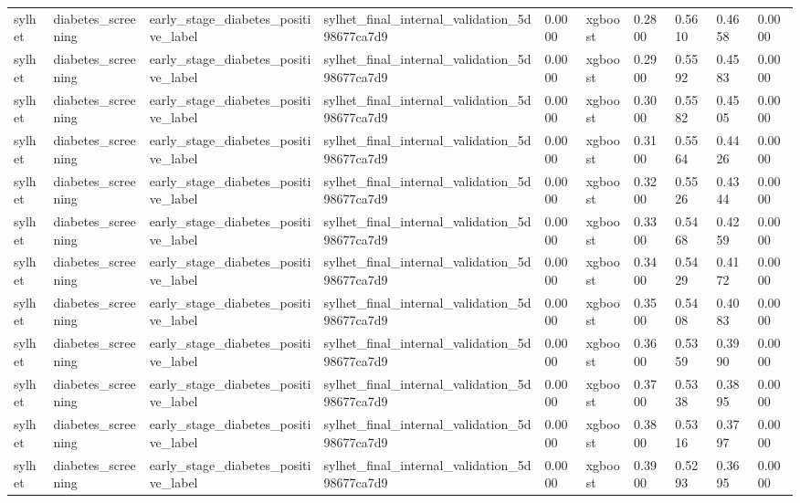 \begin{tabular}{llllllllll}
sylhet & diabetes\_screening & early\_stage\_diabetes\_positive\_label & sylhet\_final\_internal\_validation\_5d98677ca7d9 & 0.0000 & xgboost & 0.2800 & 0.5610 & 0.4658 & 0.0000 \\
sylhet & diabetes\_screening & early\_stage\_diabetes\_positive\_label & sylhet\_final\_internal\_validation\_5d98677ca7d9 & 0.0000 & xgboost & 0.2900 & 0.5592 & 0.4583 & 0.0000 \\
sylhet & diabetes\_screening & early\_stage\_diabetes\_positive\_label & sylhet\_final\_internal\_validation\_5d98677ca7d9 & 0.0000 & xgboost & 0.3000 & 0.5582 & 0.4505 & 0.0000 \\
sylhet & diabetes\_screening & early\_stage\_diabetes\_positive\_label & sylhet\_final\_internal\_validation\_5d98677ca7d9 & 0.0000 & xgboost & 0.3100 & 0.5564 & 0.4426 & 0.0000 \\
sylhet & diabetes\_screening & early\_stage\_diabetes\_positive\_label & sylhet\_final\_internal\_validation\_5d98677ca7d9 & 0.0000 & xgboost & 0.3200 & 0.5526 & 0.4344 & 0.0000 \\
sylhet & diabetes\_screening & early\_stage\_diabetes\_positive\_label & sylhet\_final\_internal\_validation\_5d98677ca7d9 & 0.0000 & xgboost & 0.3300 & 0.5468 & 0.4259 & 0.0000 \\
sylhet & diabetes\_screening & early\_stage\_diabetes\_positive\_label & sylhet\_final\_internal\_validation\_5d98677ca7d9 & 0.0000 & xgboost & 0.3400 & 0.5429 & 0.4172 & 0.0000 \\
sylhet & diabetes\_screening & early\_stage\_diabetes\_positive\_label & sylhet\_final\_internal\_validation\_5d98677ca7d9 & 0.0000 & xgboost & 0.3500 & 0.5408 & 0.4083 & 0.0000 \\
sylhet & diabetes\_screening & early\_stage\_diabetes\_positive\_label & sylhet\_final\_internal\_validation\_5d98677ca7d9 & 0.0000 & xgboost & 0.3600 & 0.5359 & 0.3990 & 0.0000 \\
sylhet & diabetes\_screening & early\_stage\_diabetes\_positive\_label & sylhet\_final\_internal\_validation\_5d98677ca7d9 & 0.0000 & xgboost & 0.3700 & 0.5338 & 0.3895 & 0.0000 \\
sylhet & diabetes\_screening & early\_stage\_diabetes\_positive\_label & sylhet\_final\_internal\_validation\_5d98677ca7d9 & 0.0000 & xgboost & 0.3800 & 0.5316 & 0.3797 & 0.0000 \\
sylhet & diabetes\_screening & early\_stage\_diabetes\_positive\_label & sylhet\_final\_internal\_validation\_5d98677ca7d9 & 0.0000 & xgboost & 0.3900 & 0.5293 & 0.3695 & 0.0000 \\

\end{tabular}
